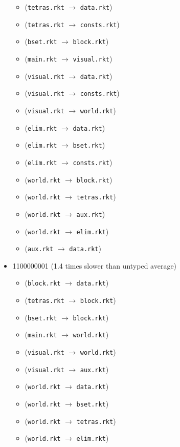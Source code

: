 \documentclass{article}
\newcommand{\mono}[1]{\texttt{#1}}
\begin{document}
\begin{itemize}
\begin{itemize}
  \item (\mono{tetras.rkt} $\rightarrow$ \mono{data.rkt})
  \item (\mono{tetras.rkt} $\rightarrow$ \mono{consts.rkt})
  \item (\mono{bset.rkt} $\rightarrow$ \mono{block.rkt})
  \item (\mono{main.rkt} $\rightarrow$ \mono{visual.rkt})
  \item (\mono{visual.rkt} $\rightarrow$ \mono{data.rkt})
  \item (\mono{visual.rkt} $\rightarrow$ \mono{consts.rkt})
  \item (\mono{visual.rkt} $\rightarrow$ \mono{world.rkt})
  \item (\mono{elim.rkt} $\rightarrow$ \mono{data.rkt})
  \item (\mono{elim.rkt} $\rightarrow$ \mono{bset.rkt})
  \item (\mono{elim.rkt} $\rightarrow$ \mono{consts.rkt})
  \item (\mono{world.rkt} $\rightarrow$ \mono{block.rkt})
  \item (\mono{world.rkt} $\rightarrow$ \mono{tetras.rkt})
  \item (\mono{world.rkt} $\rightarrow$ \mono{aux.rkt})
  \item (\mono{world.rkt} $\rightarrow$ \mono{elim.rkt})
  \item (\mono{aux.rkt} $\rightarrow$ \mono{data.rkt})
  \end{itemize}
\item 1100000001 (1.4 times slower than untyped average)
  \begin{itemize}
  \item (\mono{block.rkt} $\rightarrow$ \mono{data.rkt})
  \item (\mono{tetras.rkt} $\rightarrow$ \mono{block.rkt})
  \item (\mono{bset.rkt} $\rightarrow$ \mono{block.rkt})
  \item (\mono{main.rkt} $\rightarrow$ \mono{world.rkt})
  \item (\mono{visual.rkt} $\rightarrow$ \mono{world.rkt})
  \item (\mono{visual.rkt} $\rightarrow$ \mono{aux.rkt})
  \item (\mono{world.rkt} $\rightarrow$ \mono{data.rkt})
  \item (\mono{world.rkt} $\rightarrow$ \mono{bset.rkt})
  \item (\mono{world.rkt} $\rightarrow$ \mono{tetras.rkt})
  \item (\mono{world.rkt} $\rightarrow$ \mono{elim.rkt})

\end{itemize}
\end{itemize}
\end{document}
